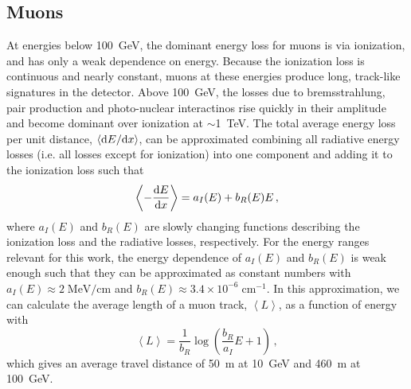 \subsection{Muons}
\label{sec:muon-propagation}
At energies below 100~GeV, the dominant energy loss for muons is via ionization, and has only a weak dependence on energy.
Because the ionization loss is continuous and nearly constant, muons at these energies produce long, track-like signatures in the detector.
Above 100~GeV, the losses due to bremsstrahlung, pair production and photo-nuclear interactinos rise quickly in their amplitude and become dominant over ionization at $\sim$1~TeV.
The total average energy loss per unit distance, $\left<\mathrm{d} E/\mathrm{d} x\right>$, can be approximated combining all radiative energy losses (i.e.
all losses except for ionization) into one component and adding it to the ionization loss such that
\begin{equation}
    \left<-\frac{\mathrm{d} E}{\mathrm{d} x}\right> = a_I(E) + b_R(E)E\,,
\end{equation}
where $a_I(E)$ and $b_R(E)$ are slowly changing functions describing the ionization loss and the radiative losses, respectively\cite{muonstoppingpower}. For the energy ranges relevant for this work, the energy dependence of $a_I(E)$ and $b_R(E)$ is weak enough such that they can be approximated as constant numbers with $a_I(E)\approx 2\;\mathrm{MeV/cm}$ and $b_R(E)\approx3.4\times10^{-6}\;\mathrm{cm^{-1}}$\cite{muonstoppingpower}.
In this approximation, we can calculate the average length of a muon track, $\left<L\right>$, as a function of energy with
\begin{equation}
    \left<L\right>=\frac{1}{b_R}\log\left(\frac{b_R}{a_I}E + 1\right)\,,
\end{equation}
which gives an average travel distance of 50~m at 10~GeV and 460~m at 100~GeV.

